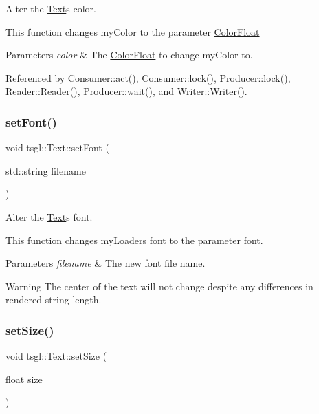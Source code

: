 Alter the \hyperlink{classtsgl_1_1_text}{Text}\textquotesingle{}s color. 

This function changes my\+Color to the parameter \hyperlink{structtsgl_1_1_color_float}{Color\+Float} 
\begin{DoxyParams}{Parameters}
{\em color} & The \hyperlink{structtsgl_1_1_color_float}{Color\+Float} to change my\+Color to. \\
\hline
\end{DoxyParams}


Referenced by Consumer\+::act(), Consumer\+::lock(), Producer\+::lock(), Reader\+::\+Reader(), Producer\+::wait(), and Writer\+::\+Writer().

\mbox{\label{classtsgl_1_1_text_a221951e84eae892f10d818cbae6e8084}} 
\subsubsection{\texorpdfstring{set\+Font()}{setFont()}}
{\footnotesize\ttfamily void tsgl\+::\+Text\+::set\+Font (\begin{DoxyParamCaption}\item[{std\+::string}]{filename }\end{DoxyParamCaption})\hspace{0.3cm}{\ttfamily [virtual]}}



Alter the \hyperlink{classtsgl_1_1_text}{Text}\textquotesingle{}s font. 

This function changes my\+Loader\textquotesingle{}s font to the parameter font. 
\begin{DoxyParams}{Parameters}
{\em filename} & The new font file name. \\
\hline
\end{DoxyParams}
\begin{DoxyWarning}{Warning}
The center of the text will not change despite any differences in rendered string length. 
\end{DoxyWarning}
\mbox{\label{classtsgl_1_1_text_aa3d3e609a29d46c6914e44fd64d18993}} 
\subsubsection{\texorpdfstring{set\+Size()}{setSize()}}
{\footnotesize\ttfamily void tsgl\+::\+Text\+::set\+Size (\begin{DoxyParamCaption}\item[{float}]{size }\end{DoxyParamCaption})\hspace{0.3cm}{\ttfamily [virtual]}}



